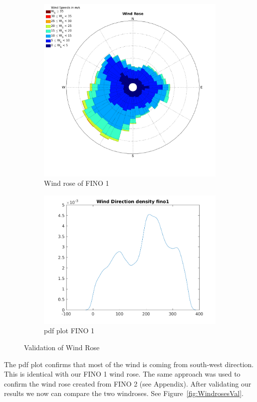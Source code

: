 \documentclass[10pt]{article}
\begin{document}
\begin{figure}[htb!]

\begin{subfigure}{0.42\textwidth}
  \centering
  \includegraphics[width=1\linewidth]{../figures/WindRose_Fino1.png}
  \caption{Wind rose of FINO 1}
\end{subfigure}
\begin{subfigure}{0.58\textwidth}
  \centering
  \includegraphics[width=1\linewidth]{../figures/Validation_WindRose_Fino1.png}
  \caption{pdf plot FINO 1}
\end{subfigure}
  \caption{Validation of Wind Rose}
\label{fig:WindroseValidation}
\end{figure}
\newpage
The pdf plot confirms that most of the wind is coming from south-west direction. This is identical with our FINO 1 wind rose. The same approach was used to confirm the wind rose created from FINO 2 (see Appendix).
After validating our results we now can compare the two windroses. See Figure~\ref{fig:WindrosesVal}.
\end{document}
